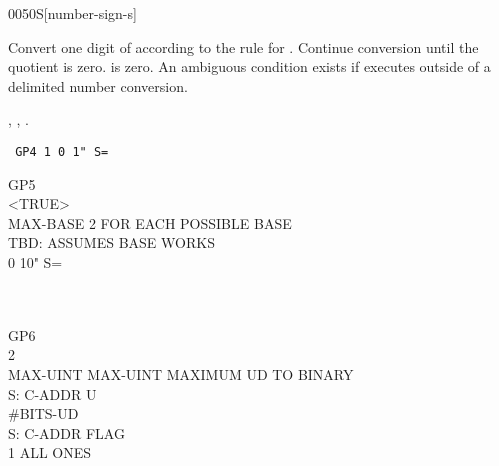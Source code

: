 \vspace*{-2ex}
\begin{worddef}[numS]{0050}{\num{}S}[number-sign-s]
\item {}

	Convert one digit of  according to the rule for
	. Continue conversion until the quotient is zero.
	 is zero. An ambiguous condition exists if
	 executes outside of a  
	delimited number conversion.

\see {},
	,
	.

	\begin{testing} %
		\ttfamily
		\texttt{\word{:} GP4   1 0    1" S= \word{;}} \\

		\word{:} GP5 \\
		\tab {}  <TRUE> \\
		\tab MAX-BASE  2 		\tab[2]  FOR EACH POSSIBLE BASE \\
		\tab[2]   \word{!}	\tab[5.8]  TBD: ASSUMES BASE WORKS \\
		\tab[3]  0     10" S=  \\
		\tab    {} \\
		\tab    {}  \word{!} \word{;} \\

		\word{:} GP6 \\
		\tab	{}    2  \word{!} \\
		\tab	MAX-UINT MAX-UINT   	\tab		{} MAXIMUM UD TO BINARY \\
		\tab	{}  \word{!}								\tab[10.6]	 S: C-ADDR U \\
		\tab	{} \#BITS-UD \word{=}  \\
		 														\tab[13.6]	 S: C-ADDR FLAG \\
		\tab[2]		  \word{[CHAR]} 1 \word{=} 	\tab[1.2]	 ALL ONES \\
		\tab[2]		   \\
		\tab	{}   \word{;} \\


\end{testing}
\end{worddef}
